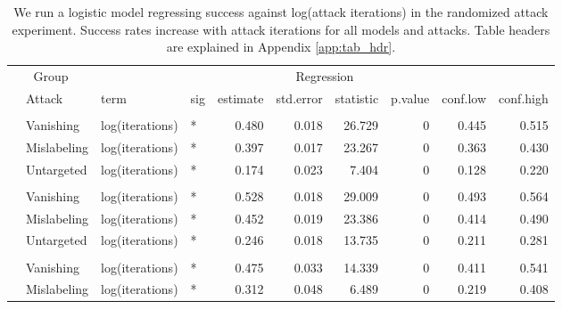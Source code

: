 \begingroup\fontsize{9}{11}\selectfont

\begin{longtable}[t]{llllrrrrrr}
\caption{\label{tab:num_iteration_table}We run a logistic model regressing success against log(attack iterations) in the randomized attack experiment. Success rates increase with attack iterations for all models and attacks. Table headers are explained in Appendix \ref{app:tab_hdr}.}\\
\toprule
\multicolumn{2}{c}{Group} & \multicolumn{8}{c}{Regression} \\
\cmidrule(l{3pt}r{3pt}){1-2} \cmidrule(l{3pt}r{3pt}){3-10}
 & Attack & term & sig & estimate & std.error & statistic & p.value & conf.low & conf.high\\
\midrule
\addlinespace[0.3em]
\multicolumn{10}{l}{\textbf{YOLOv3}}\\
\hspace{1em} & Vanishing & log(iterations) & * & 0.480 & 0.018 & 26.729 & 0 & 0.445 & 0.515\\
\cmidrule{2-10}\nopagebreak
\hspace{1em} & Mislabeling & log(iterations) & * & 0.397 & 0.017 & 23.267 & 0 & 0.363 & 0.430\\
\cmidrule{2-10}\nopagebreak
\hspace{1em} & Untargeted & log(iterations) & * & 0.174 & 0.023 & 7.404 & 0 & 0.128 & 0.220\\
\cmidrule{1-10}\pagebreak[0]
\addlinespace[0.3em]
\multicolumn{10}{l}{\textbf{SSD}}\\
\hspace{1em} & Vanishing & log(iterations) & * & 0.528 & 0.018 & 29.009 & 0 & 0.493 & 0.564\\
\cmidrule{2-10}\nopagebreak
\hspace{1em} & Mislabeling & log(iterations) & * & 0.452 & 0.019 & 23.386 & 0 & 0.414 & 0.490\\
\cmidrule{2-10}\nopagebreak
\hspace{1em} & Untargeted & log(iterations) & * & 0.246 & 0.018 & 13.735 & 0 & 0.211 & 0.281\\
\cmidrule{1-10}\pagebreak[0]
\addlinespace[0.3em]
\multicolumn{10}{l}{\textbf{RetinaNet}}\\
\hspace{1em} & Vanishing & log(iterations) & * & 0.475 & 0.033 & 14.339 & 0 & 0.411 & 0.541\\
\cmidrule{2-10}\nopagebreak
\hspace{1em} & Mislabeling & log(iterations) & * & 0.312 & 0.048 & 6.489 & 0 & 0.219 & 0.408\\

\end{longtable}
